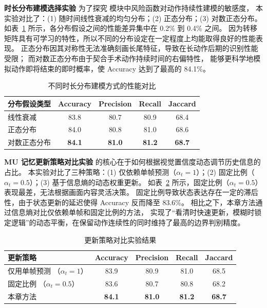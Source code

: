 \textbf{时长分布建模选择实验}\quad
为了探究 \evolution 模块中风险函数对动作持续性建模的敏感度，
本实验对比了：(1) 随时间线性衰减的均匀分布；(2) 正态分布；(3) 对数正态分布。
如表~\ref{tab:ablation_dist} 所示，各分布假设之间的性能差异集中在 0.2\% 到 0.4\% 之间。
因为转移矩阵具有可学习的特性，所以不同的分布设定在一定程度上均能取得良好的性能表现。
正态分布因其对称性无法准确刻画长尾特征，导致在长动作后期的识别性能受限；
而对数正态分布由于契合手术动作持续时间的右偏特性，
能够更科学地模拟动作即将结束的即时概率，使 Accuracy 达到了最高的 84.1\%。

\begin{table}[htbp]
\small
\renewcommand{\arraystretch}{1.0}
\centering
\caption{不同时长分布建模方式的性能对比}
\label{tab:ablation_dist}
\begin{tabular}{lcccc}
    \toprule
    分布假设类型 & Accuracy & Precision & Recall & Jaccard \\
    \midrule
    线性衰减       & 83.8 & 80.7 & 80.9 & 68.4 \\
    正态分布       & 84.0 & 80.8 & 81.0 & 68.6 \\
    对数正态分布   & \textbf{84.1} & \textbf{81.0} & \textbf{81.2} & \textbf{68.7} \\ 
    \bottomrule
\end{tabular}
\end{table}

\textbf{MU 记忆更新策略对比实验}\quad
\memoryunit 的核心在于如何根据视觉置信度动态调节历史信息的占比。
本实验对比了三种策略：(1) 仅依赖单帧预测（\(\alpha_t=1\)）；(2) 固定比例（\(\alpha_t=0.5\)）；(3) 基于信息熵的动态权重更新。
如表~\ref{tab:ablation_mu_strategy} 所示，固定比例（\(\alpha_t=0.5\)）表现最差，无法根据画面内容灵活决策。
固定比例导致状态表达存在一定的滞后性，由于状态更新的延迟使得 Accuracy 反而降至 83.6\%。
相比之下，本章方法通过信息熵对比仅依赖单帧和固定比例的方法，
实现了“看清时快速更新，模糊时锁定逻辑”的动态平衡，在保留动作连续性的同时维持了最高的边界判别精度。

\begin{table}[htbp]
\small
\renewcommand{\arraystretch}{1.0}
\centering
\caption{\memoryunit 更新策略对比实验结果}
\label{tab:ablation_mu_strategy}
\begin{tabular}{lcccc}
\toprule
更新策略 & Accuracy & Precision & Recall & Jaccard \\ 
\midrule
仅用单帧预测 （\(\alpha_t=1\)） & 83.9 & 80.9 & 81.0 & 68.5 \\
固定比例 （\(\alpha_t=0.5\)）   & 83.6 & 80.7 & 80.8 & 68.2 \\
本章方法 & \textbf{84.1} & \textbf{81.0} & \textbf{81.2} & \textbf{68.7} \\ 
\bottomrule
\end{tabular}
\end{table}

